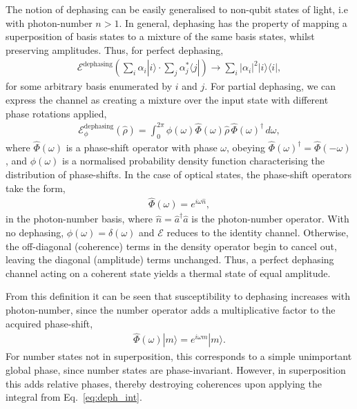 \documentclass[aps,rmp,twocolumn,amsmath,amssymb,nofootinbib,superscriptaddress]{revtex4}
\newcommand{\bra}[1]{\langle#1|}
\newcommand{\ket}[1]{|#1\rangle}
\begin{document}
The notion of dephasing can be easily generalised to non-qubit states of light, i.e with photon-number \mbox{$n>1$}. In general, dephasing has the property of mapping a superposition of basis states to a mixture of the same basis states, whilst preserving amplitudes. Thus, for perfect dephasing,
\begin{align}
\mathcal{E}^\mathrm{dephasing}\left(\sum_i \alpha_i\ket{i} \cdot \sum_j \alpha_j^*\bra{j} \right) \to \sum_i |\alpha_i|^2 \ket{i}\bra{i},
\end{align}
for some arbitrary basis enumerated by $i$ and $j$. For partial dephasing, we can express the channel as creating a mixture over the input state with different phase rotations applied,
\begin{align} \label{eq:deph_int}
\mathcal{E}_{\phi}^\mathrm{dephasing}(\hat\rho) = \int_{0}^{2\pi} \phi(\omega) \hat{\Phi}(\omega)\hat\rho\,\hat{\Phi}(\omega)^\dag\,d\omega,
\end{align}
where $\hat{\Phi}(\omega)$ is a phase-shift operator with phase $\omega$, obeying \mbox{$\hat\Phi(\omega)^\dag = \hat\Phi(-\omega)$}, and $\phi(\omega)$ is a normalised probability density function characterising the distribution of phase-shifts. In the case of optical states, the phase-shift operators take the form,
\begin{align}
\hat\Phi(\omega) = e^{i\omega\hat{n}},
\end{align}
in the photon-number basis, where $\hat{n}=\hat{a}^\dag\hat{a}$ is the photon-number operator. With no dephasing, \mbox{$\phi(\omega)=\delta(\omega)$} and $\mathcal{E}$ reduces to the identity channel. Otherwise, the off-diagonal (coherence) terms in the density operator begin to cancel out, leaving the diagonal (amplitude) terms unchanged. Thus, a perfect dephasing channel acting on a coherent state yields a thermal state of equal amplitude.

From this definition it can be seen that susceptibility to dephasing increases with photon-number, since the number operator adds a multiplicative factor to the acquired phase-shift,
\begin{align}
\hat\Phi(\omega) \ket{m} = e^{i\omega m}\ket{m}.
\end{align}
For number states not in superposition, this corresponds to a simple unimportant global phase, since number states are phase-invariant. However, in superposition this adds relative phases, thereby destroying coherences upon applying the integral from Eq.~\ref{eq:deph_int}.

%
%
\end{document}
